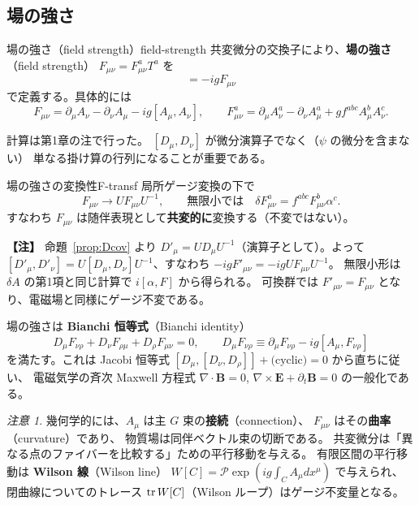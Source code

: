 \documentclass[uplatex,dvipdfmx,a4paper,11pt,openany]{jsbook}
\newcommand{\term}[2]{\textbf{#1}（#2）}
\newenvironment{note}{\vspace{1ex}\par\footnotesize\noindent\textbf{【注】}}{\par\vspace{1ex}}
\numberwithin{equation}{chapter}
\theoremstyle{definition}
\theoremstyle{plain}
\theoremstyle{remark}
\newtheorem{remark}{注意}[chapter]
\begin{document}
\subsection{場の強さ}
\begin{mydef}{場の強さ（field strength）}{field-strength}
共変微分の交換子により、\term{場の強さ}{field strength}
$F_{\mu\nu}=F_{\mu\nu}^aT^a$ を
\begin{equation}
[D_\mu,D_\nu]=-igF_{\mu\nu}
\end{equation}
で定義する。具体的には
\begin{equation}
F_{\mu\nu}=\partial_\mu A_\nu-\partial_\nu A_\mu-ig[A_\mu,A_\nu],
\qquad
F_{\mu\nu}^a=\partial_\mu A_\nu^a-\partial_\nu A_\mu^a+gf^{abc}A_\mu^bA_\nu^c .
\label{eq:Fmunu}
\end{equation}
\end{mydef}
計算は第1章の注で行った。
$[D_\mu,D_\nu]$ が微分演算子でなく（$\psi$ の微分を含まない）
単なる掛け算の行列になることが重要である。
\begin{myprop}{場の強さの変換性}{F-transf}
局所ゲージ変換の下で
\begin{equation}
F_{\mu\nu}\longrightarrow UF_{\mu\nu}U^{-1},
\qquad\text{無限小では}\quad
\delta F^a_{\mu\nu}=f^{abc}F^b_{\mu\nu}\alpha^c .
\end{equation}
すなわち $F_{\mu\nu}$ は随伴表現として\textbf{共変的に}変換する（不変ではない）。
\end{myprop}
\begin{note}
命題~\ref{prop:Dcov} より $D'_\mu=UD_\mu U^{-1}$（演算子として）。よって
$[D'_\mu,D'_\nu]=U[D_\mu,D_\nu]U^{-1}$、すなわち $-igF'_{\mu\nu}=-igUF_{\mu\nu}U^{-1}$。
無限小形は $\delta A$ の第1項と同じ計算で $i[\alpha,F]$ から得られる。
可換群では $F'_{\mu\nu}=F_{\mu\nu}$ となり、電磁場と同様にゲージ不変である。
\end{note}
場の強さは \term{Bianchi 恒等式}{Bianchi identity}
\begin{equation}
D_\mu F_{\nu\rho}+D_\nu F_{\rho\mu}+D_\rho F_{\mu\nu}=0,
\qquad
D_\mu F_{\nu\rho}\equiv\partial_\mu F_{\nu\rho}-ig[A_\mu,F_{\nu\rho}]
\end{equation}
を満たす。これは Jacobi 恒等式 $[D_\mu,[D_\nu,D_\rho]]+\text{(cyclic)}=0$ から直ちに従い、
電磁気学の斉次 Maxwell 方程式 $\nabla\cdot\bm B=0$, $\nabla\times\bm E+\partial_t\bm B=0$ の一般化である。
\begin{remark}
幾何学的には、$A_\mu$ は主 $G$ 束の\term{接続}{connection}、
$F_{\mu\nu}$ はその\term{曲率}{curvature}であり、
物質場は同伴ベクトル束の切断である。
共変微分は「異なる点のファイバーを比較する」ための平行移動を与える。
有限区間の平行移動は \term{Wilson 線}{Wilson line}
$W[C]=\mathcal{P}\exp\left(ig\int_CA_\mu dx^\mu\right)$ で与えられ、
閉曲線についてのトレース $\tr W[C]$（Wilson ループ）はゲージ不変量となる。
\end{remark}
\end{document}
